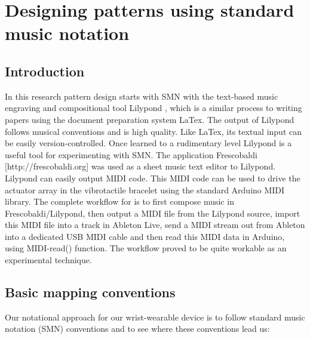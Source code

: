 \documentclass[a4paper, twocolumn]{article}
\begin{document}
\section{Designing patterns using standard music notation}

\subsection{Introduction}
In this research pattern design starts with SMN with the text-based music engraving and compositional tool Lilypond \cite{nienhuys2003lilypond}, which is a similar process to writing papers using the document preparation system LaTex. The output of Lilypond follows musical conventions and is high quality. Like LaTex, its textual input can be easily version-controlled. Once learned to a rudimentary level Lilypond is a useful tool for experimenting with SMN.  The application Frescobaldi [http://frescobaldi.org] was used as a sheet music text editor to Lilypond. Lilypond can easily output MIDI code. This MIDI code can be used to drive the actuator array in the vibrotactile bracelet using the standard Arduino MIDI library. The complete workflow for is to first compose music in Frescobaldi/Lilypond, then output a MIDI file from the Lilypond source, import this MIDI file into a track in Ableton Live, send a MIDI stream out from Ableton into a dedicated USB MIDI cable and then read this MIDI data in Arduino, using MIDI-read() function. The workflow proved to be quite workable as an experimental technique.

\subsection{Basic mapping conventions}
Our notational approach for our wrist-wearable device is to follow standard music notation (SMN) conventions and to see where these conventions lead us:
\end{document}

